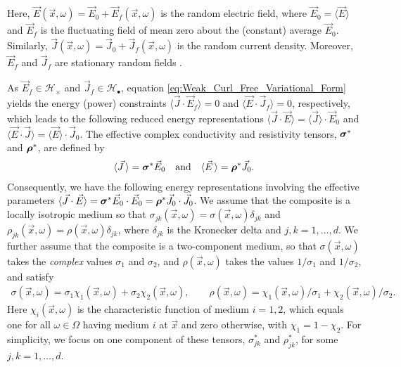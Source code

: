 \documentclass{cmslatex}
\newcommand\bsig{\mbox{\boldmath${\sigma}$}}
\newcommand\brho{\mbox{\boldmath${\rho}$}}
\begin{document}
%
Here, $\vec{E}(\vec{x},\omega)=\vec{E}_0+\vec{E}_f(\vec{x},\omega)$ is the
random electric field, where $\vec{E}_0=\langle\vec{E}\rangle$ and $\vec{E}_f$ is
the fluctuating field of mean zero about the (constant) average
$\vec{E}_0$. Similarly,
$\vec{J}(\vec{x},\omega)=\vec{J}_0+\vec{J}_f(\vec{x},\omega)$ is the random 
current density. Moreover, $\vec{E}_f$ and $\vec{J}_f$ are stationary
random fields \cite{Golden:CMP-473}. 




As $\vec{E}_f\in\mathscr{H}_\times$ and $\vec{J}_f\in\mathscr{H}_\bullet$, equation
\eqref{eq:Weak_Curl_Free_Variational_Form} yields the energy (power)
\cite{Jackson-1999} constraints $\langle\vec{J}\cdot\vec{E}_f\rangle=0$ and
$\langle\vec{E}\cdot\vec{J}_f\rangle=0$, respectively, which leads to the following
reduced energy representations $\langle\vec{J}\cdot\vec{E}\rangle=\langle\vec{J}\rangle\cdot\vec{E}_0$
and $\langle\vec{E}\cdot\vec{J}\rangle=\langle\vec{E}\rangle\cdot\vec{J}_0$. The effective complex
conductivity and resistivity tensors, $\bsig^*$ and $\brho^*$, are
defined by   
%
\begin{align}\label{eq:eff_eps_def}
    \langle \vec{J} \,\rangle=  \bsig^* \vec{E}_0
    \quad \text{and} \quad    
    \langle \vec{E} \,\rangle=  \brho^*\vec{J}_0.
\end{align}
%
Consequently, we have the following energy representations involving
the effective parameters
$\langle\vec{J}\cdot\vec{E}\rangle=\bsig^*\vec{E}_0\cdot\vec{E}_0=\brho^*\vec{J}_0\cdot\vec{J}_0$. We
assume that the composite is a locally isotropic medium so that 
$\sigma_{jk}(\vec{x},\omega)=\sigma(\vec{x},\omega)\delta_{jk}$ and
$\rho_{jk}(\vec{x},\omega)=\rho(\vec{x},\omega)\delta_{jk}$, where $\delta_{jk}$ is the
Kronecker delta and $j,k=1,\ldots,d$. We further assume that the composite
is a two-component medium, so that $\sigma(\vec{x},\omega)$ takes the
\emph{complex} values $\sigma_1$ and $\sigma_2$, and $\rho(\vec{x},\omega)$ takes the
values $1/\sigma_1$ and $1/\sigma_2$, and satisfy \cite{Golden:CMP-473}
% 
\begin{align}\label{eq:two-phase_eps}
  \sigma(\vec{x},\omega)=\sigma_1\chi_1(\vec{x},\omega)+\sigma_2\chi_2(\vec{x},\omega), \qquad
  \rho(\vec{x},\omega)=\chi_1(\vec{x},\omega)/\sigma_1+\chi_2(\vec{x},\omega)/\sigma_2.
\end{align}
%
Here $\chi_i(\vec{x},\omega)$ is the characteristic function of medium
$i=1,2$, which equals one for all $\omega\in\Omega$ having medium $i$ at $\vec{x}$
and zero otherwise, with $\chi_1=1-\chi_2$. For simplicity, we focus on one
component of these tensors, $\sigma^*_{jk}$ and $\rho^*_{jk}$, for some
$j,k=1,\ldots,d$.  
\end{document}
